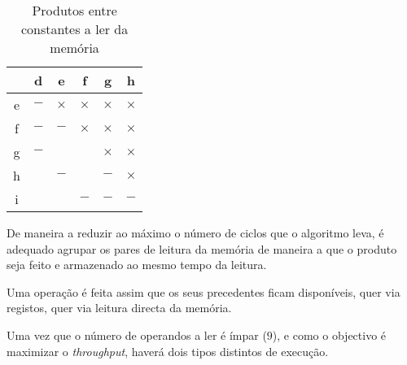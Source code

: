 \begin{table}[h]
	\centering
	\begin{tabular}{|c||c|c|c|c|c|}
		\hline
		& d & e & f & g & h  \\
		\hline
		\hline
		e & $-$ & $\times$ & $\times$ & $\times$ & $\times$  \\
		\hline
		f & $-$ & $-$ & $\times$ & $\times$ & $\times$ \\
		\hline
		g & $-$ & \checkmark & \checkmark & $\times$ & $\times$	 \\
		\hline
		h & \checkmark & $-$ & \checkmark & $-$ & $\times$ \\
		\hline
		i & \checkmark & \checkmark & $-$ & $-$ & $-$ \\
		\hline
	\end{tabular}
	\caption{Produtos entre constantes a ler da memória}
	\label{tab:produtos}
\end{table}

De maneira a reduzir ao máximo o número de ciclos que o algoritmo leva, é adequado agrupar os pares de leitura da memória de maneira a que o produto seja feito e armazenado ao mesmo tempo da leitura.

Uma operação é feita assim que os seus precedentes ficam disponíveis, quer via registos, quer via leitura directa da memória.

Uma vez que o número de operandos a ler é ímpar ($9$), e como o objectivo é maximizar o \emph{throughput}, haverá dois tipos distintos de execução.

